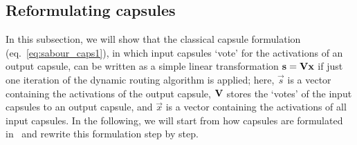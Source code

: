 \subsection{Reformulating capsules}
\label{subsec:capsule_diff_notation}
In this subsection, we will show that the classical capsule formulation (eq.~\eqref{eq:sabour_caps1}), in which input capsules `vote' for the activations of an output capsule, can be written as a simple linear transformation $\vec S = \mat v \vec x$ if just one iteration of the dynamic routing algorithm is applied; here, $\vec s$ is a vector containing the activations of the output capsule, $\mat v$ stores the `votes' of the input capsules to an output capsule, and $\vec x$ is a vector containing the activations of all input capsules. In the following, we will start from how capsules are formulated in~ and rewrite this formulation step by step.

